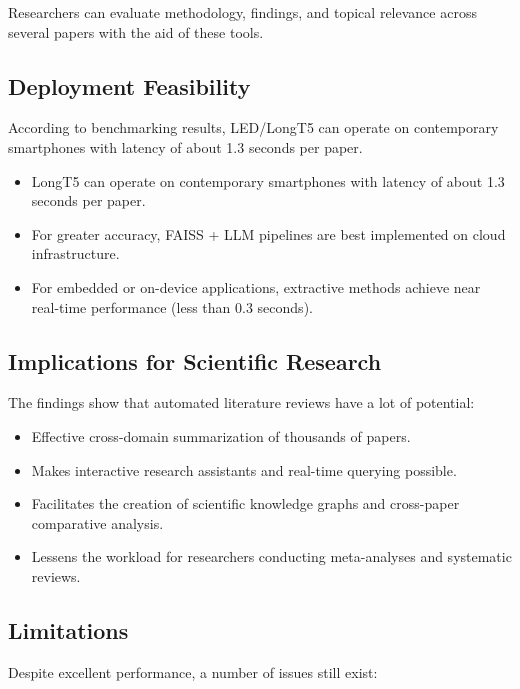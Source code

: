 \documentclass[conference]{IEEEtran}
\begin{document}
Researchers can evaluate methodology, findings, and topical relevance across several papers with the aid of these tools.

\subsection{Deployment Feasibility}

According to benchmarking results, LED/LongT5 can operate on contemporary smartphones with latency of about 1.3 seconds per paper.
\begin{itemize}
\item LongT5 can operate on contemporary smartphones with latency of about 1.3 seconds per paper.
\item For greater accuracy, FAISS + LLM pipelines are best implemented on cloud infrastructure.
\item For embedded or on-device applications, extractive methods achieve near real-time performance (less than 0.3 seconds).
\end{itemize}

\subsection{Implications for Scientific Research}

The findings show that automated literature reviews have a lot of potential:

\begin{itemize}
\item Effective cross-domain summarization of thousands of papers.
\item Makes interactive research assistants and real-time querying possible.
\item Facilitates the creation of scientific knowledge graphs and cross-paper comparative analysis.
\item Lessens the workload for researchers conducting meta-analyses and systematic reviews.
\end{itemize}

\subsection{Limitations}

Despite excellent performance, a number of issues still exist:
\end{document}

